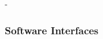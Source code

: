 -\documentclass[compsoc,draftclsnofoot,onecolumn,10pt]{IEEEtran}
\begin{document}
\subsubsection{Software Interfaces} %
%
%
%
\end{document}
